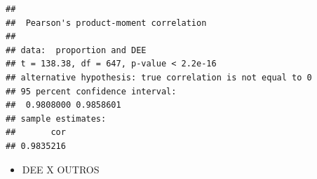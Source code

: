 \documentclass[]{article}
\newenvironment{Shaded}{\begin{snugshade}}{\end{snugshade}}
\newcommand{\KeywordTok}[1]{\textcolor[rgb]{0.13,0.29,0.53}{\textbf{#1}}}
\newcommand{\DataTypeTok}[1]{\textcolor[rgb]{0.13,0.29,0.53}{#1}}
\newcommand{\StringTok}[1]{\textcolor[rgb]{0.31,0.60,0.02}{#1}}
\newcommand{\OperatorTok}[1]{\textcolor[rgb]{0.81,0.36,0.00}{\textbf{#1}}}
\newcommand{\NormalTok}[1]{#1}
\providecommand{\tightlist}{%
  \setlength{\itemsep}{0pt}\setlength{\parskip}{0pt}}
\begin{document}
\begin{verbatim}
## 
##  Pearson's product-moment correlation
## 
## data:  proportion and DEE
## t = 138.38, df = 647, p-value < 2.2e-16
## alternative hypothesis: true correlation is not equal to 0
## 95 percent confidence interval:
##  0.9808000 0.9858601
## sample estimates:
##       cor 
## 0.9835216
\end{verbatim}

\begin{itemize}
\tightlist
\item
  DEE X OUTROS
\end{itemize}

\begin{Shaded}
\begin{Highlighting}[]
\NormalTok{freq03 <-}\StringTok{ }\NormalTok{PROP_PALAVRA }\OperatorTok{%
\StringTok{    }\KeywordTok{gather}\NormalTok{(DIRETORIA, proportion, }\KeywordTok{c}\NormalTok{(}\StringTok{`}\DataTypeTok{OUTROS}\StringTok{`}\NormalTok{))}
  
}
\end{Highlighting}
\end{Shaded}
\end{document}
